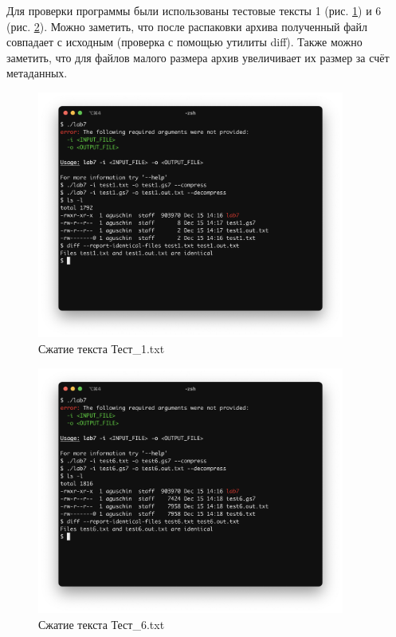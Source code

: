 \documentclass[a4paper,oneside]{article}
\theoremstyle{definition}
\begin{document}
Для проверки программы были использованы тестовые тексты 1 (рис.
\ref{fig:test_1}) и 6 (рис. \ref{fig:test_6}). Можно заметить,
что после распаковки архива полученный файл совпадает с исходным (проверка
с помощью утилиты diff). Также можно заметить, что для файлов малого размера
архив увеличивает их размер за счёт метаданных.

\begin{figure}[H]
  \centering
  \includegraphics[width=0.9\textwidth]{test1.png}
  \caption{Сжатие текста Тест\_1.txt}
  \label{fig:test_1}
\end{figure}

\begin{figure}[H]
  \centering
  \includegraphics[width=0.9\textwidth]{test6.png}
  \caption{Сжатие текста Тест\_6.txt}
  \label{fig:test_6}
\end{figure}
\end{document}
